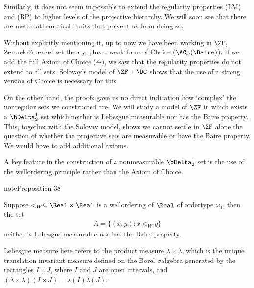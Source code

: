 \documentclass[letterpaper,10pt,english]{jupyterBook}
\begin{document}
\sphinxAtStartPar
Similarly, it does not seem impossible to extend the regularity properties (LM) and (BP) to higher levels of the projective hierarchy. We will soon see that there are metamathematical limits that prevent us from doing so.

\sphinxAtStartPar
Without explicitly mentioning it, up to now we have been working in \(\ZF\), Zermelo\sphinxhyphen{}Fraenkel set theory, plus a weak form of Choice (\(\AC_\omega(\Baire)\)). If we add the full Axiom of Choice (\(\AC\)), we saw that the regularity properties do not extend to all sets. Solovay’s model of \(\ZF+\DC\) shows that the use of a strong version of Choice is necessary for this.

\sphinxAtStartPar
On the other hand, the proofs gave us no direct indication how ‘complex’ the non\sphinxhyphen{}regular sets we constructed are.
We will study a model of \(\ZF\) in which exists a \(\bDelta^1_2\) set which neither is Lebesgue measurable nor has the Baire property. This, together with the Solovay model, shows we cannot settle in \(\ZF\) alone the question of whether the projective sets are measurable or have the Baire property. We would have to add additional axioms.

\sphinxAtStartPar
A key feature in the construction of a non\sphinxhyphen{}measurable \(\bDelta^1_2\) set is the use of the well\sphinxhyphen{}ordering principle rather than the Axiom of Choice.
\label{projective:prop-non-meas}
\begin{sphinxadmonition}{note}{Proposition 38}



\sphinxAtStartPar
Suppose \(<_W \subseteq \Real\times\Real\) is a well\sphinxhyphen{}ordering of \(\Real\) of order\sphinxhyphen{}type \(\omega_1\), then the set
\begin{equation*}
\begin{split}
A = \{(x,y) \colon x <_W y\}
\end{split}
\end{equation*}
\sphinxAtStartPar
neither is Lebesgue measurable nor has the Baire property.
\end{sphinxadmonition}

\sphinxAtStartPar
Lebesgue measure here refers to the product measure \(\lambda \times \lambda\), which is the unique translation invariant measure defined on the Borel \(\sigma\)\sphinxhyphen{}algebra generated by the rectangles \(I \times J\), where \(I\) and \(J\) are open intervals, and \((\lambda\times \lambda)(I \times J) = \lambda(I)\lambda(J)\).
\end{document}
